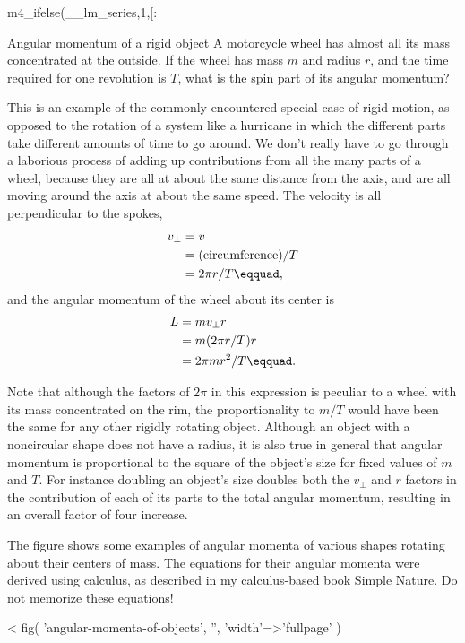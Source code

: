 m4_ifelse(__lm_series,1,[:
\begin{eg}{Angular momentum of a rigid object}
\egquestion A motorcycle wheel has almost all its mass
concentrated at the outside. If the wheel has mass $m$ and
radius $r$, and the time required for one revolution is $T$,
what is the spin part of its angular momentum?

\eganswer This is an example of the commonly encountered
special case of rigid motion, as opposed to the rotation of
a system like a hurricane in which the different parts take
different amounts of time to go around. We don't really have
to go through a laborious process of adding up contributions
from all the many parts of a wheel, because they are all at
about the same distance from the axis, and are all moving
around the axis at about the same speed. The velocity is all
perpendicular to the spokes,
\begin{align*}
 v_\perp &= v \\
 &= (\text{circumference})/T \\
 &= 2\pi r/T\eqquad,
\end{align*}
and the angular momentum of the wheel about its center is
\begin{align*}
 L &= mv_{\perp}r \\
 &= m(2\pi r/T)r \\
 &= 2\pi mr^2/T\eqquad.
\end{align*}
\end{eg}

Note that although the factors of $2\pi $ in this expression
is peculiar to a wheel with its mass concentrated on the
rim, the proportionality to $m/T$ would have been the same
for any other rigidly rotating object. Although an object
with a noncircular shape does not have a radius, it is also
true in general that angular momentum is proportional to the
square of the object's size for fixed values of $m$ and $T$.
For instance doubling an object's size doubles both the $v_{\perp}$
and $r$ factors in the contribution of each of its parts to
the total angular momentum, resulting in an overall
factor of four increase.

The figure shows some examples of angular momenta of
various shapes rotating about their centers of mass. The
equations for their angular momenta were derived using
calculus, as described in my calculus-based book Simple
Nature. Do not memorize these equations!

<%
  fig(
    'angular-momenta-of-objects',
    '',
    {'width'=>'fullpage'}
  )


